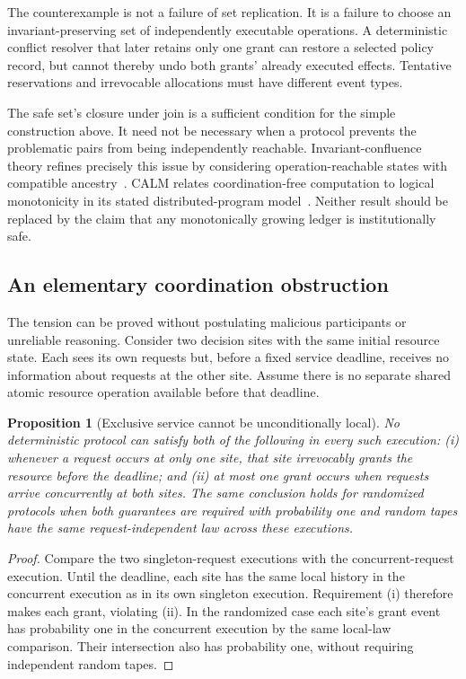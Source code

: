 \documentclass[11pt,letterpaper]{article}
\theoremstyle{plain}
\newtheorem{proposition}{Proposition}[section]
\theoremstyle{definition}
\theoremstyle{remark}
\begin{document}
The counterexample is not a failure of set replication. It is a failure to choose an invariant-preserving set of independently executable operations. A deterministic conflict resolver that later retains only one grant can restore a selected policy record, but cannot thereby undo both grants' already executed effects. Tentative reservations and irrevocable allocations must have different event types.

The safe set's closure under join is a sufficient condition for the simple construction above. It need not be necessary when a protocol prevents the problematic pairs from being independently reachable. Invariant-confluence theory refines precisely this issue by considering operation-reachable states with compatible ancestry~\cite{bailisinvariant}. CALM relates coordination-free computation to logical monotonicity in its stated distributed-program model~\cite{hellerstein-calm}. Neither result should be replaced by the claim that any monotonically growing ledger is institutionally safe.

\subsection{An elementary coordination obstruction}
The tension can be proved without postulating malicious participants or unreliable reasoning. Consider two decision sites with the same initial resource state. Each sees its own requests but, before a fixed service deadline, receives no information about requests at the other site. Assume there is no separate shared atomic resource operation available before that deadline.

\begin{proposition}[Exclusive service cannot be unconditionally local]\label{prop:exclusive-service}
No deterministic protocol can satisfy both of the following in every such execution: (i) whenever a request occurs at only one site, that site irrevocably grants the resource before the deadline; and (ii) at most one grant occurs when requests arrive concurrently at both sites. The same conclusion holds for randomized protocols when both guarantees are required with probability one and random tapes have the same request-independent law across these executions.
\end{proposition}
\begin{proof}
Compare the two singleton-request executions with the concurrent-request execution. Until the deadline, each site has the same local history in the concurrent execution as in its own singleton execution. Requirement (i) therefore makes each grant, violating (ii). In the randomized case each site's grant event has probability one in the concurrent execution by the same local-law comparison. Their intersection also has probability one, without requiring independent random tapes.
\end{proof}
\end{document}
